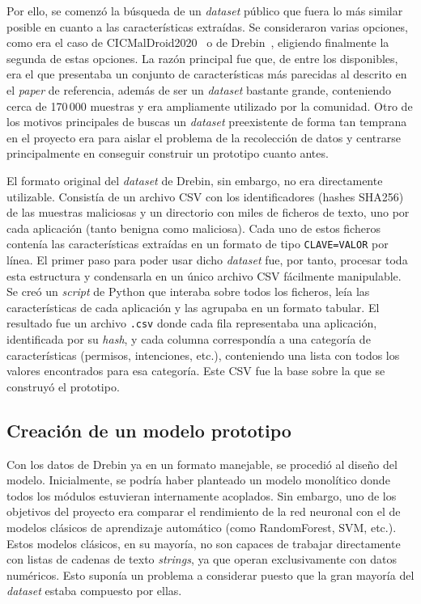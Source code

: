 Por ello, se comenzó la búsqueda de un \textit{dataset} público que fuera lo más similar posible en cuanto a las características extraídas. Se consideraron varias opciones, como era el caso de CICMalDroid2020~\cite{mahdavifar2020dynamic} o de Drebin~\cite{arp2014drebin}, eligiendo finalmente la segunda de estas opciones. La razón principal fue que, de entre los disponibles, era el que presentaba un conjunto de características más parecidas al descrito en el \textit{paper} de referencia, además de ser un \textit{dataset} bastante grande, conteniendo cerca de 170\,000 muestras y era ampliamente utilizado por la comunidad. Otro de los motivos principales de buscas un \textit{dataset} preexistente de forma tan temprana en el proyecto era para aislar el problema de la recolección de datos y centrarse principalmente en conseguir construir un prototipo cuanto antes.

El formato original del \textit{dataset} de Drebin, sin embargo, no era directamente utilizable. Consistía de un archivo CSV con los identificadores (hashes SHA256) de las muestras maliciosas y un directorio con miles de ficheros de texto, uno por cada aplicación (tanto benigna como maliciosa). Cada uno de estos ficheros contenía las características extraídas en un formato de tipo \texttt{CLAVE=VALOR} por línea. El primer paso para poder usar dicho \textit{dataset} fue, por tanto, procesar toda esta estructura y condensarla en un único archivo CSV fácilmente manipulable. Se creó un \textit{script} de Python que interaba sobre todos los ficheros, leía las características de cada aplicación y las agrupaba en un formato tabular. El resultado fue un archivo \texttt{.csv} donde cada fila representaba una aplicación, identificada por su \textit{hash}, y cada columna correspondía a una categoría de características (permisos, intenciones, etc.), conteniendo una lista con todos los valores encontrados para esa categoría. Este CSV fue la base sobre la que se construyó el prototipo.

\subsection{Creación de un modelo prototipo}

Con los datos de Drebin ya en un formato manejable, se procedió al diseño del modelo. Inicialmente, se podría haber planteado un modelo monolítico donde todos los módulos estuvieran internamente acoplados. Sin embargo, uno de los objetivos del proyecto era comparar el rendimiento de la red neuronal con el de modelos clásicos de aprendizaje automático (como RandomForest, SVM, etc.). Estos modelos clásicos, en su mayoría, no son capaces de trabajar directamente con listas de cadenas de texto \textit{strings}, ya que operan exclusivamente con datos numéricos. Esto suponía un problema a considerar puesto que la gran mayoría del \textit{dataset} estaba compuesto por ellas.

